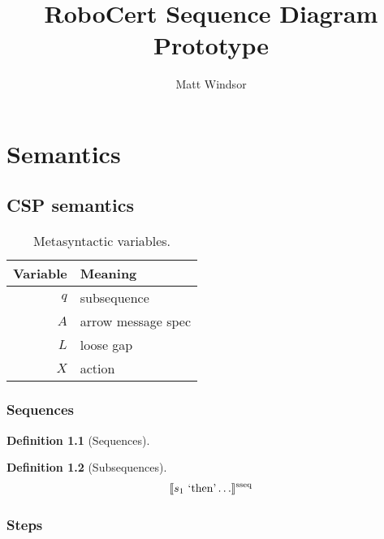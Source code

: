 \documentclass[a4paper,11pt]{report}
\title{RoboCert Sequence Diagram Prototype}
\author{Matt Windsor}
\theoremstyle{definition}
\newtheorem{defn}{Definition}
\newcommand{\lquote}[1]{\text{`#1'}}
\newcommand{\sema}[1]{\llbracket #1 \rrbracket}
\newcommand{\thead}[1]{\textbf{#1}}
\newcommand{\anarrow}{A}
\newcommand{\astep}{s}
\newcommand{\anlgap}{L}
\newcommand{\asseq}{q}
\newcommand{\anaction}{X}
\begin{document}
\maketitle

\chapter{Semantics}

\section{CSP semantics}

\newcommand{\stepsema}[1]{\sema{#1}^{\text{step}}}
\newcommand{\lgapsema}[2]{\sema{#1}^{\text{lgap}}_{(#2)}}
\newcommand{\actsema}[1]{\sema{#1}^{\text{act}}}
\newcommand{\arrsema}[1]{\sema{#1}^{\text{arr}}}
\newcommand{\sseqsema}[1]{\sema{#1}^{\text{sseq}}}

\begin{table}
	\centering

	\begin{tabular}{rl}
	\toprule
	\thead{Variable} & \thead{Meaning}
	\\
	\midrule
	\(\asseq\) & subsequence
	\\
	\(\anarrow\) & arrow message spec
	\\
	\(\anlgap\) & loose gap
	\\
	\(\anaction\) & action
	\\
	\bottomrule
	\end{tabular}

	\caption{Metasyntactic variables.}
	\label{tab:metasyntactic-variables}
\end{table}

\subsection{Sequences}

\begin{defn}[Sequences]
\end{defn}

\begin{defn}[Subsequences]

\begin{align*}
	\sseqsema{\astep_1\ \lquote{\lstinline|then|} \dotso}
\end{align*}

\end{defn}

\subsection{Steps}
\end{document}
